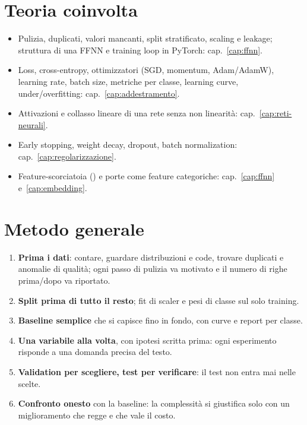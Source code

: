 \section{Teoria coinvolta}
\begin{itemize}
  \item Pulizia, duplicati, valori mancanti, split stratificato, scaling e leakage; struttura di una
        FFNN e training loop in PyTorch: cap.~\ref{cap:ffnn}.
  \item Loss, cross-entropy, ottimizzatori (SGD, momentum, Adam/AdamW), learning rate, batch size,
        metriche per classe, learning curve, under/overfitting: cap.~\ref{cap:addestramento}.
  \item Attivazioni e collasso lineare di una rete senza non linearità: cap.~\ref{cap:reti-neurali}.
  \item Early stopping, weight decay, dropout, batch normalization: cap.~\ref{cap:regolarizzazione}.
  \item Feature-scorciatoia () e porte come feature categoriche: cap.~\ref{cap:ffnn}
        e~\ref{cap:embedding}.
\end{itemize}

\section{Metodo generale}
\begin{enumerate}
  \item \textbf{Prima i dati}: contare, guardare distribuzioni e code, trovare duplicati e anomalie di
        qualità; ogni passo di pulizia va motivato e il numero di righe prima/dopo va riportato.
  \item \textbf{Split prima di tutto il resto}; fit di scaler e pesi di classe sul solo training.
  \item \textbf{Baseline semplice} che si capisce fino in fondo, con curve e report per classe.
  \item \textbf{Una variabile alla volta}, con ipotesi scritta prima: ogni esperimento risponde a una
        domanda precisa del testo.
  \item \textbf{Validation per scegliere, test per verificare}: il test non entra mai nelle scelte.
  \item \textbf{Confronto onesto} con la baseline: la complessità si giustifica solo con un
        miglioramento che regge e che vale il costo.
\end{enumerate}

